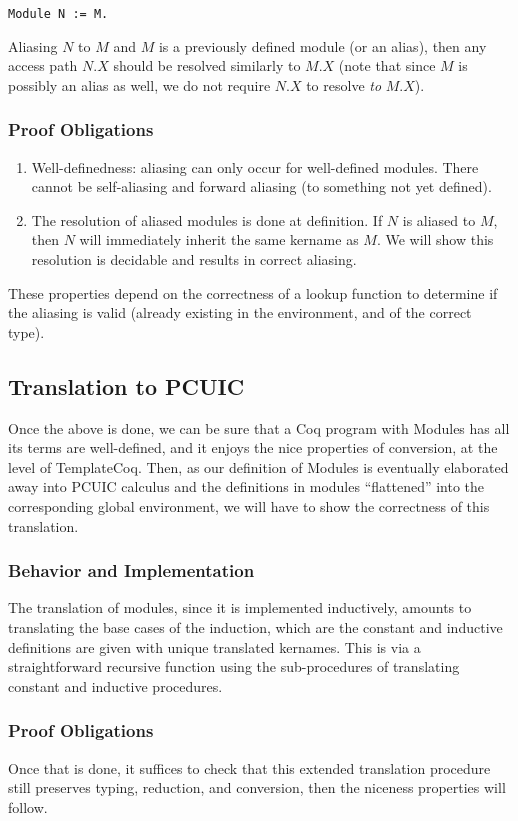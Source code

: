 \begin{verbatim}
Module N := M.
\end{verbatim}

Aliasing $N$ to $M$ and $M$ is a previously defined module (or an alias), then
any access path $N.X$ should be resolved similarly to $M.X$ (note that since $M$
is possibly an alias as well, we do not require $N.X$ to resolve \emph{to}
$M.X$). 

\subsubsection{Proof Obligations}
\begin{enumerate}
\item Well-definedness: aliasing can only occur for well-defined modules. There
    cannot be self-aliasing and forward aliasing (to something not yet defined).
\item The resolution of aliased modules is done at definition. If $N$ is aliased
    to $M$, then $N$ will immediately inherit the same kername as $M$. We will
    show this resolution is decidable and results in correct aliasing.
\end{enumerate}

These properties depend on the correctness of a lookup function to determine if
the aliasing is valid (already existing in the environment, and of the correct type).

\subsection{Translation to PCUIC}
Once the above is done, we can be sure that a Coq program with Modules has all
its terms are well-defined, and it enjoys the nice properties of conversion, at
the level of TemplateCoq. Then, as our definition of Modules is eventually
elaborated away into PCUIC calculus and the definitions in modules ``flattened''
into the corresponding global environment, we will have to show the correctness
of this translation.

\subsubsection*{Behavior and Implementation}
The translation of modules, since it is implemented inductively, amounts to
translating the base cases of the induction, which are the constant and
inductive definitions are given with unique translated kernames. This is via a
straightforward recursive function using the sub-procedures of translating
constant and inductive procedures.

\subsubsection*{Proof Obligations}
Once that is done, it suffices to check that this extended translation procedure
still preserves typing, reduction, and conversion, then the niceness properties
will follow.